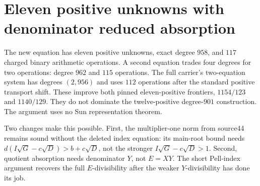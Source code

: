 \section{Eleven positive unknowns with denominator reduced absorption}
\label{sec:eleven958}

The new equation has eleven positive unknowns, exact degree $958$, and
$117$ charged binary arithmetic operations. A second equation trades four
degrees for two operations: degree $962$ and $115$ operations. The full
carrier's two-equation system has degrees $(2,956)$ and uses $112$
operations after the standard positive transport shift. These improve
both pinned eleven-positive frontiers, $1154/123$ and $1140/129$.
They do not dominate the twelve-positive degree-$901$ construction.
The argument uses no Sun representation theorem.

Two changes make this possible. First, the multiplier-one norm from
source44 remains sound without the deleted index equation: its main-root
bound needs $d(I\sqrt G-c\sqrt D)>b+c\sqrt D$, not the stronger
$I\sqrt G-c\sqrt D>1$. Second, quotient absorption needs denominator
$Y$, not $E=XY$. The short Pell-index argument recovers the full
$E$-divisibility after the weaker $Y$-divisibility has done its job.


